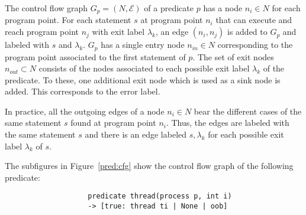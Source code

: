\documentclass[11pt]{article}
\begin{document}
The control flow graph
$G_p = (N, \mathcal{E})$ of a predicate $p$ has a node $n_i \in N$ 
for each program point. For each statement $s$ at program point $n_i$ that can 
execute and reach program point $n_j$ with exit label $\lambda_k$, an edge 
$(n_i, n_j)$ is added to $G_p$ and labeled with $s$ and $\lambda_k$. $G_p$ has 
a single entry node $n_{in} \in N$ corresponding to the program point associated 
to the first statement of $p$. The set of exit nodes $n_{out} \subset N$ consists 
of the nodes associated to each possible exit label $\lambda_k$ of the predicate.
To these, one additional exit node which is used as a sink node is added. This
corresponds to the \textsf{error} label.

In practice, all the outgoing edges of a node $n_i \in N$ bear the different cases
of the same statement $s$ found at program point $n_i$. Thus, the edges are labeled
with the same statement $s$ and there is an edge labeled $s, \lambda_k$ for each 
possible exit label $\lambda_k$ of $s$. 

The subfigures in Figure~\ref{pred:cfg} show the control flow graph of the following 
predicate: 

\begin{figure}[!h]\centering
\begin{lstlisting}
              predicate thread(process p, int i) 
              -> [true: thread ti | None | oob]
\end{lstlisting}
\end{figure}
\end{document}
